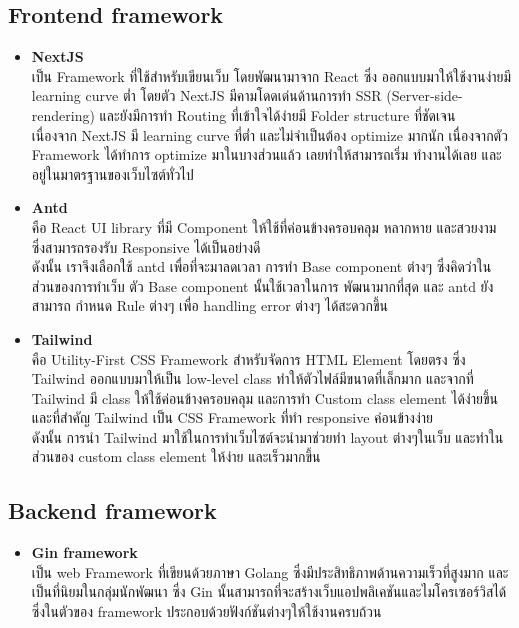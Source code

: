 \documentclass[12pt,oneside,openright,a4paper]{cpe-thai-project}
\begin{document}
\subsection{Frontend framework}
\begin{itemize}
  \item \textbf{NextJS} \\
\hspace*{1cm} เป็น Framework ที่ใช้สำหรับเขียนเว็บ โดยพัฒนามาจาก React ซึ่ง ออกแบบมาให้ใช้งานง่ายมี learning curve ต่ำ โดยตัว NextJS มีคามโดดเด่นด้านการทำ SSR (Server-side-rendering) และยังมีการทำ Routing ที่เข้าใจได้ง่ายมี Folder structure ที่ชัดเจน \\
\hspace*{1cm} เนื่องจาก NextJS มี learning curve ที่ต่ำ และไม่จำเป็นต้อง optimize มากนัก เนื่องจากตัว Framework ได้ทำการ optimize มาในบางส่วนแล้ว เลยทำให้สามารถเริ่ม ทำงานได้เลย และอยู่ในมาตรฐานของเว็บไซต์ทั่วไป
  \item \textbf{Antd} \\
\hspace*{1cm} คือ React UI library ที่มี  Component ให้ใช้ที่ค่อนข้างครอบคลุม หลากหาย และสวยงาม ซึ่งสามารถรองรับ Responsive ได้เป็นอย่างดี \\
\hspace*{1cm} ดังนั้น เราจึงเลือกใช้ antd เพื่อที่จะมาลดเวลา การทำ Base component ต่างๆ ซึ่งคิดว่าในส่วนของการทำเว็บ ตัว Base component นั้นใช้เวลาในการ พัฒนามากที่สุด และ antd ยังสามารถ กำหนด Rule ต่างๆ เพื่อ handling error ต่างๆ ได้สะดวกขึ้น
  \item \textbf{Tailwind} \\
\hspace*{1cm} คือ Utility-First CSS Framework สำหรับจัดการ HTML Element โดยตรง ซึ่ง Tailwind ออกแบบมาให้เป็น low-level class ทำให้ตัวไฟล์มีขนาดที่เล็กมาก และจากที่ Tailwind มี class ให้ใช้ค่อนข้างครอบคลุม และการทำ Custom class element ได้ง่ายขึ้น และที่สำคัญ Tailwind เป็น CSS Framework ที่ทำ responsive ค่อนข้างง่าย \\
\hspace*{1cm} ดังนั้น การนำ Tailwind มาใช้ในการทำเว็บไซต์จะนำมาช่วยทำ layout ต่างๆในเว็บ และทำในส่วนของ custom class element ให้ง่าย และเร็วมากขึ้น
\end{itemize}
\subsection{Backend framework}
\begin{itemize}
  \item \textbf{Gin framework} \\
\hspace*{1cm} เป็น web Framework ที่เขียนด้วยภาษา Golang ซึ่งมีประสิทธิภาพด้านความเร็วที่สูงมาก และเป็นที่นิยมในกลุ่มนักพัฒนา ซึ่ง Gin นั้นสามารถที่จะสร้างเว็บแอปพลิเคชันและไมโครเซอร์วิสได้ ซึ่งในตัวของ framework ประกอบด้วยฟังก์ชันต่างๆให้ใช้งานครบถ้วน 
\end{itemize}
\end{document}
